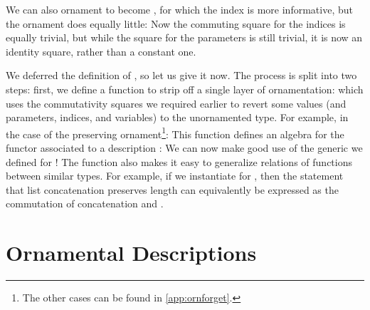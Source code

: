 We can also ornament  to become , for which the index is more informative,
but the ornament does equally little:
Now the commuting square for the indices is equally trivial, but while the square for the parameters is still trivial, it is now an identity square, rather than a constant one.

We deferred the definition of , so let us give it now. The process is split into two steps: first, we define a function to strip off a single layer of ornamentation:
which uses the commutativity squares we required earlier to revert some values (and parameters, indices, and variables) to the unornamented type. For example, in the case of the  preserving ornament\footnote{The other cases can be found in \autoref{app:ornforget}.}:
This function defines an algebra for the functor associated to a description :
We can now make good use of the generic  we defined for !
The function  also makes it easy to generalize relations of functions between similar types. For example, if we instantiate  for , then the statement that list concatenation preserves length can equivalently be expressed as the commutation of concatenation and .


%

\section{Ornamental Descriptions}

